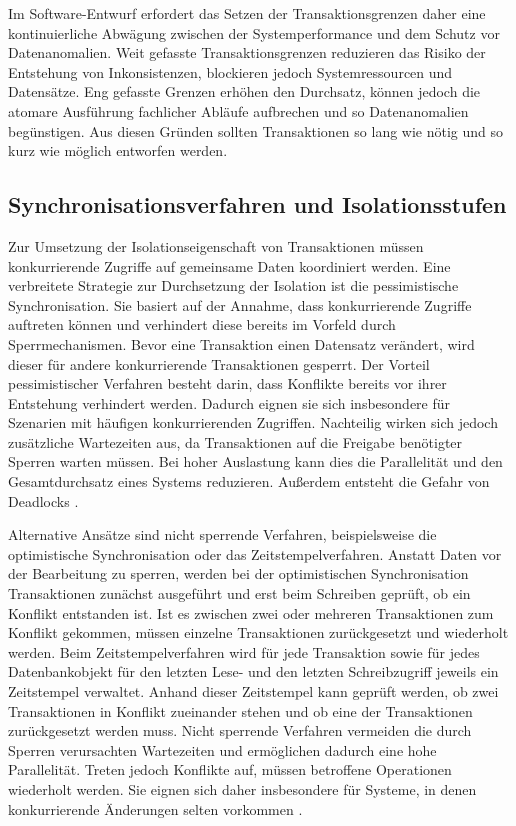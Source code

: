 Im Software-Entwurf erfordert das Setzen der Transaktionsgrenzen daher eine kontinuierliche Abwägung zwischen der Systemperformance
und dem Schutz vor Datenanomalien.
Weit gefasste Transaktionsgrenzen reduzieren das Risiko der Entstehung von Inkonsistenzen, blockieren jedoch Systemressourcen und Datensätze.
Eng gefasste Grenzen erhöhen den Durchsatz, können jedoch die atomare Ausführung fachlicher Abläufe aufbrechen und so Datenanomalien begünstigen.
Aus diesen Gründen sollten Transaktionen so lang wie nötig und so kurz wie möglich entworfen werden.

\subsection{Synchronisationsverfahren und Isolationsstufen}
\label{subsec:synchronisation}
Zur Umsetzung der Isolationseigenschaft von Transaktionen müssen konkurrierende Zugriffe auf gemeinsame Daten koordiniert werden.
Eine verbreitete Strategie zur Durchsetzung der Isolation ist die pessimistische Synchronisation.
Sie basiert auf der Annahme, dass konkurrierende Zugriffe auftreten können und verhindert diese bereits im Vorfeld durch Sperrmechanismen.
Bevor eine Transaktion einen Datensatz verändert, wird dieser für andere konkurrierende Transaktionen gesperrt.
Der Vorteil pessimistischer Verfahren besteht darin, dass Konflikte bereits vor ihrer Entstehung verhindert werden.
Dadurch eignen sie sich insbesondere für Szenarien mit häufigen konkurrierenden Zugriffen.
Nachteilig wirken sich jedoch zusätzliche Wartezeiten aus, da Transaktionen auf die Freigabe benötigter Sperren warten müssen.
Bei hoher Auslastung kann dies die Parallelität und den Gesamtdurchsatz eines Systems reduzieren.
Außerdem entsteht die Gefahr von Deadlocks \parencite[253--257]{kudras_taschenbuch_2015}.

Alternative Ansätze sind nicht sperrende Verfahren, beispielsweise die optimistische Synchronisation oder das Zeitstempelverfahren.
Anstatt Daten vor der Bearbeitung zu sperren, werden bei der optimistischen Synchronisation Transaktionen zunächst ausgeführt und
erst beim Schreiben geprüft, ob ein Konflikt entstanden ist.
Ist es zwischen zwei oder mehreren Transaktionen zum Konflikt gekommen, müssen einzelne Transaktionen zurückgesetzt und wiederholt werden.
Beim Zeitstempelverfahren wird für jede Transaktion sowie für jedes Datenbankobjekt für den letzten Lese- und den letzten
Schreibzugriff jeweils ein Zeitstempel verwaltet.
Anhand dieser Zeitstempel kann geprüft werden, ob zwei Transaktionen in Konflikt zueinander stehen und ob eine der Transaktionen
zurückgesetzt werden muss.
Nicht sperrende Verfahren vermeiden die durch Sperren verursachten Wartezeiten und ermöglichen dadurch eine hohe Parallelität.
Treten jedoch Konflikte auf, müssen betroffene Operationen wiederholt werden.
Sie eignen sich daher insbesondere für Systeme, in denen konkurrierende Änderungen selten vorkommen \parencite[257--259]{kudras_taschenbuch_2015}.

